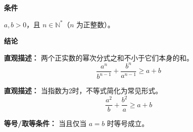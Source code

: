 \begin{statementbox}
\textbf{\textcolor{CStatement}{条件}}
\begin{description}[style=nextline, leftmargin=2.8em, labelsep=0.5em, itemsep=0.35em]
    \item[\textbf{\textcolor{CStatement}{条件 1（正实数条件）：}}] $a,b>0$，且 $n\in\mathbb{N}^{*}$（$n$ 为正整数）。
\end{description}

\textbf{\textcolor{CStatement}{结论}}
\begin{description}[style=nextline, leftmargin=2.8em, labelsep=0.5em, itemsep=0.45em]
    \item[\textbf{\textcolor{CStatement}{结论一（对称分式不等式）：}}]
    \textbf{\textcolor{CStatement}{直观描述：}} 两个正实数的幂次分式之和不小于它们本身的和。
    \[
    \frac{a^{n}}{b^{n-1}}+\frac{b^{n}}{a^{n-1}}\geqslant a+b
    \]

    \item[\textbf{\textcolor{CStatement}{推广结论（n=2特例）：}}]
    \textbf{\textcolor{CStatement}{直观描述：}} 当指数为2时，不等式简化为常见形式。
    \[
    \frac{a^{2}}{b}+\frac{b^{2}}{a}\geqslant a+b
    \]
\end{description}

\textbf{\textcolor{CStatement}{等号/取等条件：}} 当且仅当 $a=b$ 时等号成立。
\end{statementbox}

